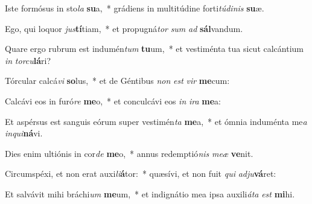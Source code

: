 \item Iste formósus in sto\textit{la} \textbf{su}a,~* grádiens in multitúdine forti\textit{tú}\textit{di}\textit{nis} \textbf{su}æ.
\item Ego, qui loquor \textit{jus}\textbf{tí}tiam,~* et propugná\textit{tor} \textit{sum} \textit{ad} \textbf{sál}vandum.
\item Quare ergo rubrum est indumén\textit{tum} \textbf{tu}um,~* et vestiménta tua sicut calcántium \textit{in} \textit{tor}\textit{cu}\textbf{lá}ri?
\item Tórcular calcá\textit{vi} \textbf{so}lus,~* et de Géntibus \textit{non} \textit{est} \textit{vir} \textbf{me}cum:
\item Calcávi eos in furó\textit{re} \textbf{me}o,~* et conculcávi eos \textit{in} \textit{i}\textit{ra} \textbf{me}a:
\item Et aspérsus est sanguis eórum super vestimén\textit{ta} \textbf{me}a,~* et ómnia induménta me\textit{a} \textit{in}\textit{qui}\textbf{ná}vi.
\item Dies enim ultiónis in cor\textit{de} \textbf{me}o,~* annus redemptió\textit{nis} \textit{me}\textit{æ} \textbf{ve}nit.
\item Circumspéxi, et non erat auxi\textit{li}\textbf{á}tor:~* quæsívi, et non fuit \textit{qui} \textit{ad}\textit{ju}\textbf{vá}ret:
\item Et salvávit mihi bráchi\textit{um} \textbf{me}um,~* et indignátio mea ipsa auxili\textit{á}\textit{ta} \textit{est} \textbf{mi}hi.
